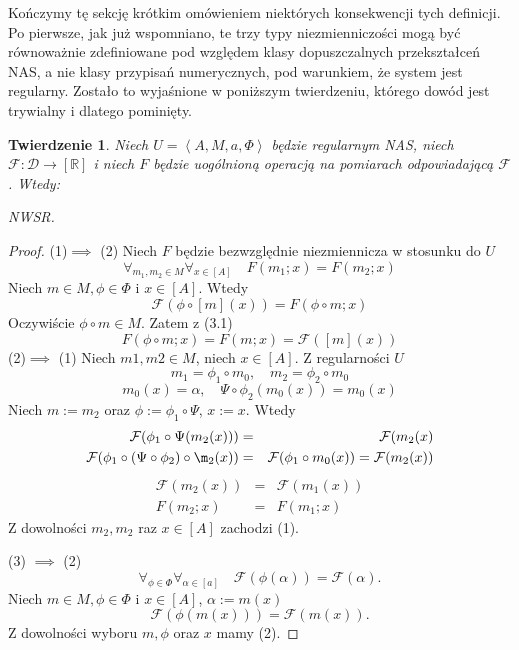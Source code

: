 \documentclass[12pt,a4paper]{report}
\newtheorem{tw}[definition]{Twierdzenie}
\newcommand{\domkniecie}[1]{\left\lbrack{#1}\right\rbrack}
\newcommand{\tuple}[1]{\left\langle {#1} \right\rangle}
\begin{document}
Kończymy tę sekcję krótkim omówieniem niektórych konsekwencji tych definicji. Po pierwsze, jak już wspomniano, te trzy typy niezmienniczości mogą być równoważnie zdefiniowane pod względem klasy dopuszczalnych przekształceń NAS, a nie klasy przypisań numerycznych, pod warunkiem, że system jest regularny. Zostało to wyjaśnione w poniższym twierdzeniu, którego dowód jest trywialny i dlatego pominięty.
\begin{tw}
Niech $U=\tuple{A,M,a,\Phi}$ będzie regularnym NAS, niech $\mathcal{F}:\mathcal{D}\to \domkniecie{\mathbb{R}}$ i niech $F$ będzie uogólnioną operacją na pomiarach odpowiadającą $\mathcal{F}$. Wtedy:

\item
NWSR.
\begin{enumerate}
\item
$F$ jest niezmienna bezwzględnie w stosunku do $U$ 
\item
$$
\forall_{m \in M}\forall_{\phi \in \Phi}\forall_{x \in \domkniecie{A} \quad {}(\phi(\domkniecie{m}(x)))=(\domkniecie{m}(x)).
$$
\item
$$
\forall_{\phi \in \Phi} \forall_{\alpha \in \domkniecie{a}} \quad {}(\phi(\alpha))=(\alpha).
$$
\end{enumerate}

\end{tw}
\begin{proof}
(1)$\implies$ (2)
Niech $F$ będzie bezwzględnie niezmiennicza w stosunku do $U$
\begin{equation}
\forall_{m_{1}, m_{2} \in M}  \forall_{x \in \domkniecie{A}} \quad F(m_{1};x)=F(m_{2};x)
\end{equation}
Niech $m \in M, \phi \in \Phi$ i $x \in \domkniecie{A}$. Wtedy
$$
\mathcal{F}(\phi \circ \domkniecie{m}(x))=F(\phi \circ m;x)
$$
Oczywiście $\phi \circ m \in M$. Zatem z (3.1)
$$
F(\phi \circ m; x)=F(m;x)=\mathcal{F}(\domkniecie{m}(x))
$$
(2)$\implies$ (1)
Niech $m1,m2 \in M$, niech $x\in\domkniecie{A}$.
Z regularności $U$
$$
m_1=\phi_1\circ m_0, \quad m_2=\phi_2\circ m_0
$$
$$
m_0(x)=\alpha, \quad \Psi\circ \phi_2(m_0(x))=m_0(x)
$$
Niech $m:=m_2$ oraz $\phi:=\phi_1\circ\Psi$, $x:=x$. Wtedy
\begin{eqnarray*}
\mathcal{F}(\phi_1\circ \Psi(m_2(x))) & = & \mathcal{F}(m_2(x) \\
\mathcal{F}(\phi_1\circ(\Psi\circ \phi_2)\circ \m_2(x)) & = & \mathcal{F}(\phi_1\circ m_0(x)) = \mathcal{F}(m_2(x))
\end{eqnarray*}
\begin{eqnarray*}
\mathcal{F}(m_2(x)) & = & \mathcal{F}(m_1(x))\\
F(m_2;x) & = & F(m_1;x)
\end{eqnarray*}
Z dowolności $m_2,m_2$ raz $x\in \domkniecie{A}$ zachodzi (1).

(3) $\implies$ (2)
$$
\forall_{\phi \in \Phi} \forall_{\alpha \in \domkniecie{a}} \quad \mathcal{F}(\phi(\alpha))=\mathcal{F}(\alpha).
$$
Niech $m\in M, \phi \in \Phi$ i $x\in\domkniecie{A}$, $\alpha:=m(x)$
$$
 \mathcal{F}(\phi(m(x)))=\mathcal{F}(m(x)).
$$
Z dowolności wyboru $m, \phi$ oraz $x$ mamy (2).
\end{proof}
\end{document}
